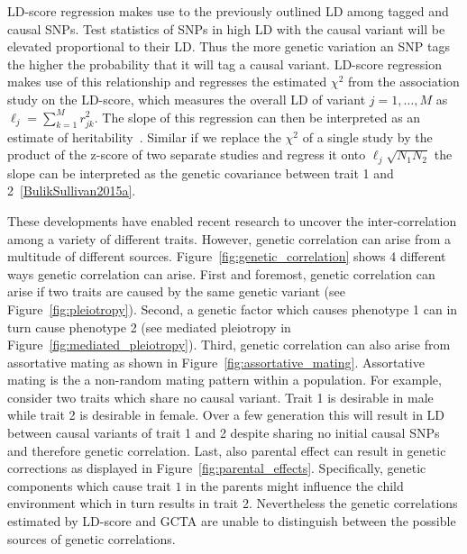 LD-score regression makes use to the previously outlined LD among tagged and causal SNPs.
Test statistics of SNPs in high LD with the causal variant will be elevated proportional to their LD\@.
Thus the more genetic variation an SNP tags the higher the probability that it will tag a causal variant.
LD-score regression makes use of this relationship and regresses the estimated $\chi^2$ from the association study on the LD-score, which measures the overall LD of variant $j = 1, \ldots, M$ as $\ell_j = \sum^M_{k=1} r^2_{jk}$. 
The slope of this regression can then be interpreted as an estimate of heritability~\cite{Bulik-Sullivan2015}.
Similar if we replace the $\chi^2$ of a single study by the product of the z-score of two separate studies and regress it onto $\ell_j \sqrt{N_{1}N_{2}}$ the slope can be interpreted as the genetic covariance between trait 1 and 2~\ref{BulikSullivan2015a}.

These developments have enabled recent research to uncover the inter-correlation among a variety of different traits.
However, genetic correlation can arise from a multitude of different sources.
Figure~\ref{fig:genetic_correlation} shows 4 different ways genetic correlation can arise.
First and foremost, genetic correlation can arise if two traits are caused by the same genetic variant (see Figure~\ref{fig:pleiotropy}).
Second, a genetic factor which causes phenotype 1 can in turn cause phenotype 2 (see mediated pleiotropy in Figure~\ref{fig:mediated_pleiotropy}).
Third, genetic correlation can also arise from assortative mating as shown in Figure~\ref{fig:assortative_mating}.
Assortative mating is the a non-random mating pattern within a population.
For example, consider two traits which share no causal variant.
Trait 1 is desirable in male while trait 2 is desirable in female.
Over a few generation this will result in LD between causal variants of trait 1 and 2 despite sharing no initial causal SNPs and therefore genetic correlation. 
Last, also parental effect can result in genetic corrections as displayed in Figure~\ref{fig:parental_effects}.
Specifically, genetic components which cause trait $1$ in the parents might influence the child environment which in turn results in trait 2. 
Nevertheless the genetic correlations estimated by LD-score and GCTA are unable to distinguish between the possible sources of genetic correlations.

